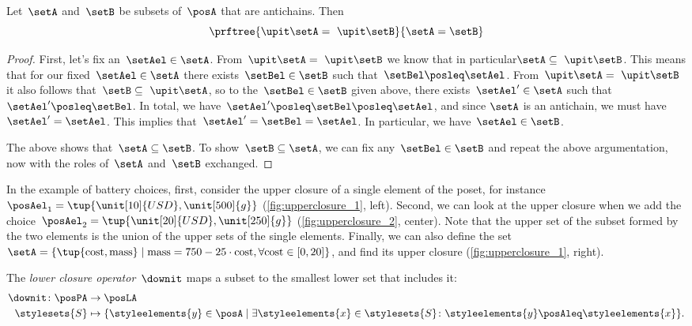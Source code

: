 \begin{lemma}
  \label{lem:up-cl-inj-antichains}
  Let~$\setA$ and~$\setB$ be subsets of~$\posA$ that are antichains. Then
  \begin{equation*}
    \prftree{\upit  \setA = \ \upit  \setB}{\setA = \setB}
  \end{equation*}
\end{lemma}

\begin{proof}
  First, let's fix an~$\setAel \in \setA$.
  From~$\upit  \setA = \ \upit  \setB$ we know that in particular$\setA \subseteq \ \upit  \setB$.
  This means that for our fixed~$\setAel \in \setA$ there exists~$\setBel \in \setB$ such that~$\setBel \posleq \setAel$.
  From~$\upit \setA = \ \upit  \setB$ it also follows that~$\setB \subseteq \ \upit  \setA$, so to the~$\setBel \in \setB$ given above, there exists~$\setAel' \in \setA$ such that~$\setAel' \posleq \setBel$.
  In total, we have~$\setAel' \posleq \setBel \posleq \setAel$, and since $\setA$ is an antichain, we must have~$\setAel' = \setAel$.
  This implies that~$\setAel' = \setBel = \setAel$. In particular, we have~$\setAel \in \setB$.

  The above shows that~$\setA \subseteq \setB$.
  To show~$\setB \subseteq \setA$, we can fix any~$\setBel \in \setB$ and repeat the above argumentation, now with the roles of~$\setA$ and~$\setB$ exchanged.
\end{proof}

In the example of battery choices, first, consider the upper closure of a single element of the poset, for instance~$\posAel_1=\tup{\unit[10]{USD},\unit[500]{g}}$ (\cref{fig:upperclosure_1}, left).
Second, we can look at the upper closure when we add the choice~$\posAel_2=\tup{\unit[20]{USD},\unit[250]{g}}$ (\cref{fig:upperclosure_2}, center).
Note that the upper set of the subset formed by the two elements is the union of the upper sets of the single elements.
Finally, we can also define the set~$\setA=\{\tup{\text{cost},\text{mass}}\mid \text{mass}=750-25\cdot \text{cost}, \forall \text{cost} \in [0,20]\}$, and find its upper closure (\cref{fig:upperclosure_1}, right).
\begin{figure*}[h!]
  \centering
  \caption{Example of uppler closure for different sets of battery choices. }
  \label{fig:upperclosure_1}
\end{figure*}

\begin{definition}
  \label{def:lowerclosure}
  The \emph{lower closure operator}~$\downit$ maps a subset to the smallest lower set that includes it:
  \begin{equation*}
    \begin{aligned}
      \downit \colon \posPA&\to \posLA\\
      \stylesets{S}&\mapsto \{ \styleelements{y}\in \posA \mid \exists \styleelements{x}\in \stylesets{S} \colon \styleelements{y}\posAleq \styleelements{x}\}.
    \end{aligned}
  \end{equation*}
\end{definition}

